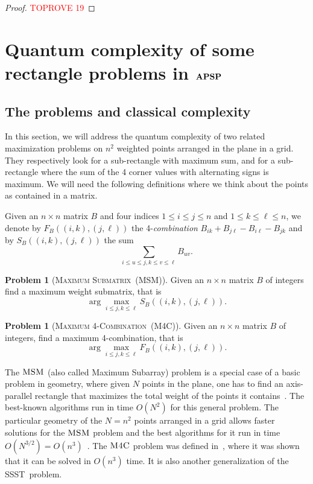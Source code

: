 \documentclass[12pt]{article}
\newcommand{\MaxSubMf}{\textsc{Maximum Submatrix}}
\newcommand{\MaxSubM}{\textsc{MSM}}
\newcommand{\MaxFourCf}{\textsc{Maximum 4-Combination}}
\newcommand{\MaxFourC}{\textsc{M4C}}
\newcommand{\SSST}{\textsc{SSST}}
\newcommand{\APSPc}{\bf{APSP}}
\theoremstyle{definition}
\newtheorem{problem}[theorem]{Problem}
\begin{document}
\begin{proof}\textcolor{red}{TOPROVE 19}\end{proof}

\section{Quantum complexity of some rectangle problems in $\APSPc$}
\label{sec:apsp}
\subsection{The problems and classical complexity}
\label{subsec:classical}

In this section, we will address the quantum complexity of two related maximization problems on $n^2$ weighted points arranged in the plane in a grid. 
They respectively look for a sub-rectangle with maximum sum, and for a sub-rectangle where the sum of the 4 corner values with alternating signs is maximum. We will need the following definitions where we think about the points as contained in a matrix.

Given an $n \times n$ matrix $B$ and four indices $1 \leq i \leq j \leq n$ and $1 \leq k \leq \ell \leq n$, we denote by $F_B((i,k),(j,\ell))$ the 4-{\em combination} $B_{ik} + B_{j \ell} - B_{i \ell} - B_{jk}$ and by $S_B((i,k),(j,\ell))$ the sum
$$\sum_{i \leq u \leq j, k \leq v \leq \ell} B_{uv}.$$

\begin{problem}[\MaxSubMf \ (\MaxSubM)]
\label{prob:maxsubm}
 Given an $n \times n$ matrix $B$ of integers find a maximum weight submatrix, that is $$\arg\max_{i \leq j, k \leq  \ell } S_B((i,k),(j,\ell)).$$
\end{problem}

\begin{problem}[\MaxFourCf \ (\MaxFourC)]
\label{prob:maxfourc}
 Given an $n \times n$ matrix $B$ of integers, find a maximum 4-combination, that is $$\arg\max_{i \leq j, k \leq  \ell } F_B((i,k),(j,\ell)).$$
\end{problem}

The $\MaxSubM$ (also called Maximum Subarray) problem is a special case of a basic problem in geometry, where given $N$ points in the plane, one has to find an axis-parallel rectangle that maximizes the total weight of the points it contains~\cite{DGM96, BCNP14}. The best-known algorithms run in time $O(N^2)$ for this general problem. The particular geometry of the $N =n^2$ points arranged in a grid allows faster solutions for the $\MaxSubM$ problem and the best algorithms for it run in time $O(N^{3/2}) = O(n^3)$~\cite{TT98, Tak02}. The $\MaxFourC$ problem was defined in~\cite{BDT16}, where it was shown that it can be solved in $O(n^3)$ time. It is also another generalization of the \SSST \ problem. 
\end{document}
